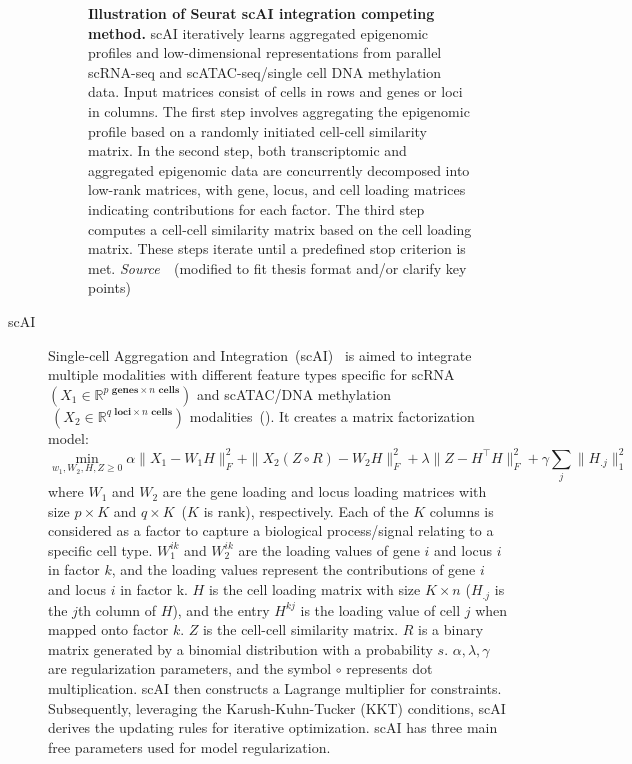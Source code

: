 \begin{description}
\begin{figure}[!h]
  	\vspace{0.1cm}
  	\caption[Illustration of Seurat scAI integration competing method.]{\textbf{Illustration of Seurat scAI integration competing method.} scAI iteratively learns aggregated epigenomic profiles and low-dimensional representations from parallel scRNA-seq and scATAC-seq/single cell DNA methylation data. Input matrices consist of cells in rows and genes or loci in columns. The first step involves aggregating the epigenomic profile based on a randomly initiated cell-cell similarity matrix. In the second step, both transcriptomic and aggregated epigenomic data are concurrently decomposed into low-rank matrices, with gene, locus, and cell loading matrices indicating contributions for each factor. The third step computes a cell-cell similarity matrix based on the cell loading matrix. These steps iterate until a predefined stop criterion is met. \emph{Source~\cite{jin2020scai}}~(modified to fit thesis format and/or clarify key points)
  }
  	\label{fig:Alg_scAI}
\end{figure}

  \item[scAI]
  Single-cell Aggregation and Integration~(scAI)~\citep{jin2020scai} is aimed to integrate multiple modalities with different feature types specific for scRNA $(X_1\in \mathbb{R}^{p \textbf{ genes} \times n \textbf{ cells}})$ and scATAC/DNA methylation$~(X_2\in \mathbb{R}^{q \textbf{ loci}\times n \textbf{ cells}})$ modalities~(). It creates a matrix factorization model:
  \begin{equation}
  \min_{w_1,W_2,H,Z\geq 0} \alpha \|X_1-W_1H\|_F^2 + \|X_2(Z \circ R)-W_2H\|_F^2 + \lambda \|Z-H^\top H\|_F^2 + \gamma\sum_j \|H_{.j}\|_1^2
  \end{equation}
  where $W_1$ and $W_2$ are the gene loading and locus loading matrices with size $p\times K$ and $q\times K$~($K$ is rank), respectively. Each of the $K$ columns is considered as a factor to capture a biological process/signal relating to a specific cell type. $W_1^{ik}$ and $W_2^{ik}$ are the loading values of gene $i$ and locus $i$ in factor $k$, and the loading values represent the contributions of gene $i$ and locus $i$ in factor k. $H$ is the cell loading matrix with size $K\times n$ ($H_{.j}$ is the $j$th column of $H$), and the entry $H^{kj}$ is the loading value of cell $j$ when mapped onto factor $k$. $Z$ is the cell-cell similarity matrix. $R$ is a binary matrix generated by a binomial distribution with a probability $s$. $\alpha, \lambda, \gamma$ are regularization parameters, and the symbol $\circ$ represents dot multiplication. scAI then constructs a Lagrange multiplier for constraints. Subsequently, leveraging the Karush-Kuhn-Tucker (KKT) conditions, scAI derives the updating rules for iterative optimization. scAI has three main free parameters used for model regularization.


\end{description}
